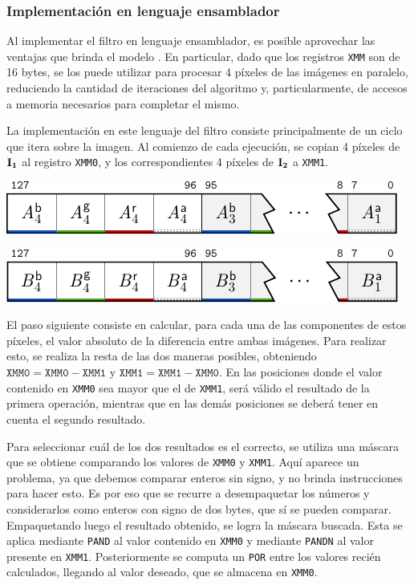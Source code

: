     \subsubsection{Implementación en lenguaje ensamblador}
      Al implementar el filtro en lenguaje ensamblador, es posible aprovechar las ventajas que brinda el modelo . En particular, dado que los registros \texttt{XMM} son de 16 bytes, se los puede utilizar para procesar 4 píxeles de las imágenes en paralelo, reduciendo la cantidad de iteraciones del algoritmo y, particularmente, de accesos a memoria necesarios para completar el mismo.

      La implementación en este lenguaje del filtro consiste principalmente de un ciclo que itera sobre la imagen. Al comienzo de cada ejecución, se copian 4 píxeles de $\mathbf{I_1}$ al registro \texttt{XMM0}, y los correspondientes 4 píxeles de $\mathbf{I_2}$ a \texttt{XMM1}.

      \begin{center}
         \includegraphics{imagenes/diff-registros-1.pdf}

         \includegraphics{imagenes/diff-registros-2.pdf}
      \end{center}

      El paso siguiente consiste en calcular, para cada una de las componentes de estos píxeles, el valor absoluto de la diferencia entre ambas imágenes. Para realizar esto, se realiza la resta de las dos maneras posibles, obteniendo $\mathtt{XMM0} = \mathtt{XMM0} - \mathtt{XMM1}$ y $\mathtt{XMM1} = \mathtt{XMM1} - \mathtt{XMM0}$. En las posiciones donde el valor contenido en \texttt{XMM0} sea mayor que el de \texttt{XMM1}, será válido el resultado de la primera operación, mientras que en las demás posiciones se deberá tener en cuenta el segundo resultado.

      Para seleccionar cuál de los dos resultados es el correcto, se utiliza una máscara que se obtiene comparando los valores de \texttt{XMM0} y \texttt{XMM1}. Aquí aparece un problema, ya que debemos comparar enteros sin signo, y  no brinda instrucciones para hacer esto. Es por eso que se recurre a desempaquetar los números y considerarlos como enteros con signo de dos bytes, que sí se pueden comparar. Empaquetando luego el resultado obtenido, se logra la máscara buscada. Esta se aplica mediante \texttt{PAND} al valor contenido en \texttt{XMM0} y mediante \texttt{PANDN} al valor presente en \texttt{XMM1}. Posteriormente se computa un \texttt{POR} entre los valores recién calculados, llegando al valor deseado, que se almacena en \texttt{XMM0}.


